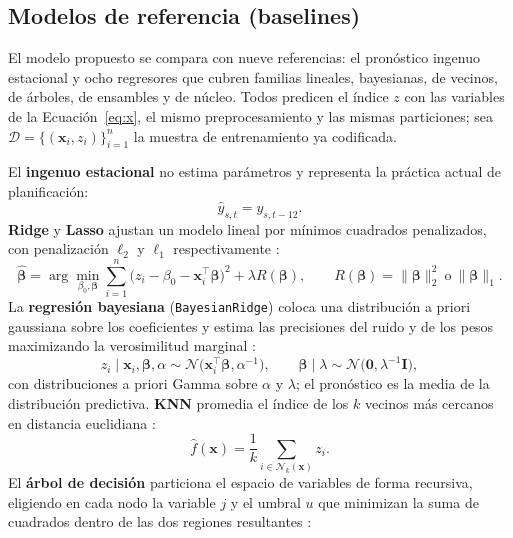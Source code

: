 \documentclass[pdflatex,sn-mathphys-num]{sn-jnl}
\begin{document}
\subsection{Modelos de referencia (baselines)}\label{subsec:sota}

El modelo propuesto se compara con nueve referencias: el pronóstico ingenuo estacional y ocho regresores que cubren familias lineales, bayesianas, de vecinos, de árboles, de ensambles y de núcleo. Todos predicen el índice $z$ con las variables de la Ecuación~\eqref{eq:x}, el mismo preprocesamiento y las mismas particiones; sea $\mathcal{D}=\{(\mathbf{x}_i,z_i)\}_{i=1}^{n}$ la muestra de entrenamiento ya codificada.

El \textbf{ingenuo estacional} \cite{hyndman2021} no estima parámetros y representa la práctica actual de planificación:
\begin{equation}
\hat{y}_{s,t}=y_{s,t-12}.
\label{eq:naive}
\end{equation}
\textbf{Ridge} y \textbf{Lasso} ajustan un modelo lineal por mínimos cuadrados penalizados, con penalización $\ell_2$ y $\ell_1$ respectivamente \cite{hoerl1970,tibshirani1996}:
\begin{equation}
\hat{\boldsymbol{\beta}}=\arg\min_{\beta_0,\boldsymbol{\beta}}\sum_{i=1}^{n}\bigl(z_i-\beta_0-\mathbf{x}_i^{\top}\boldsymbol{\beta}\bigr)^2+\lambda R(\boldsymbol{\beta}),\qquad R(\boldsymbol{\beta})=\lVert\boldsymbol{\beta}\rVert_2^2\ \text{o}\ \lVert\boldsymbol{\beta}\rVert_1.
\label{eq:ridge}
\end{equation}
La \textbf{regresión bayesiana} (\texttt{BayesianRidge}) coloca una distribución a priori gaussiana sobre los coeficientes y estima las precisiones del ruido y de los pesos maximizando la verosimilitud marginal \cite{mackay1992}:
\begin{equation}
z_i\mid\mathbf{x}_i,\boldsymbol{\beta},\alpha\sim\mathcal{N}\bigl(\mathbf{x}_i^{\top}\boldsymbol{\beta},\alpha^{-1}\bigr),\qquad \boldsymbol{\beta}\mid\lambda\sim\mathcal{N}\bigl(\mathbf{0},\lambda^{-1}\mathbf{I}\bigr),
\label{eq:bayes}
\end{equation}
con distribuciones a priori Gamma sobre $\alpha$ y $\lambda$; el pronóstico es la media de la distribución predictiva. \textbf{KNN} promedia el índice de los $k$ vecinos más cercanos en distancia euclidiana \cite{cover1967}:
\begin{equation}
\hat{f}(\mathbf{x})=\frac{1}{k}\sum_{i\in\mathcal{N}_k(\mathbf{x})}z_i.
\label{eq:knn}
\end{equation}
El \textbf{árbol de decisión} particiona el espacio de variables de forma recursiva, eligiendo en cada nodo la variable $j$ y el umbral $u$ que minimizan la suma de cuadrados dentro de las dos regiones resultantes \cite{breiman1984}:
\end{document}
